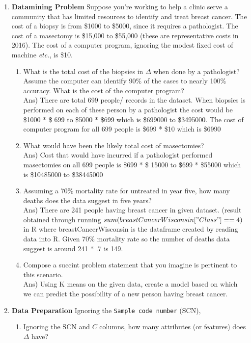 \documentclass{article}
\begin{document}
\begin{enumerate}\item  {\bf Datamining Problem} Suppose you're working to help a clinic serve a community that has limited resources to identify and treat breast cancer.  The cost of a biopsy is from \$1000 to \$5000, since it requires a pathologist.  The cost of a masectomy is \$15,000 to \$55,000 (these are representative costs in 2016).   The cost of a computer program, ignoring the modest fixed cost of machine {\it etc.}, is \$10.

 \begin{enumerate} \item What is the total cost of the biopsies in $\Delta$ when done by a pathologist?  Assume the computer can identify 90\% of the cases to nearly 100\% accuracy.  What is the cost of the computer program? \\
 Ans) There are total 699 people/ records in the dataset. When biopsies is performed on each of these person by a pathologist the cost would be \$1000 * \$ 699 to \$5000 * \$699 which is \$699000 to \$3495000. The cost of computer program for all 699 people is \$699 * \$10 which is \$6990
 \item What would have been the likely total cost of masectomies?  \\
Ans) Cost that would have incurred if a pathologist performed masectomies on all 699 people is \$699 * \$ 15000 to \$699 * \$55000 which is \$10485000 to \$38445000
 \item Assuming a 70\% mortality rate for untreated in year five, how many deaths does the data suggest in five years? \\
 Ans) There are 241 people having breast cancer in given dataset. (result obtained through running $sum(breastCancerWisconsin["Class"] == 4)$ in R where breastCancerWisconsin is the dataframe created by reading data into R.
 Given 70\% mortality rate so the number of deaths data suggest is around 241 * .7 is 149.
 \item Compose a succint problem statement that you imagine is pertinent to this scenario. \\
Ans) Using K means on the given data, create a model based on which we can predict the possibility of a new person having breast cancer.
\end{enumerate} 
 \item {\bf Data Preparation} Ignoring the \texttt{Sample code number} (SCN), \begin{enumerate} \item Ignoring the SCN and $C$ columns, how many attributes (or features) does $\Delta$ have?  \\

\end{enumerate}
\end{enumerate}
\end{document}
